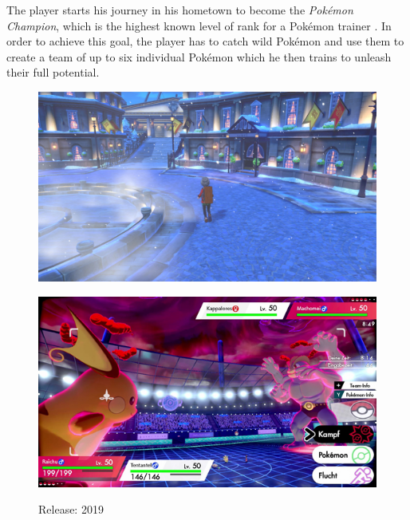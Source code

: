 The player starts his journey in his hometown to become the \textit{Pokémon Champion}, which is the highest known 
level of rank for a Pokémon trainer . In order
to achieve this goal, the player has to catch wild Pokémon and use them to create a team of up to six individual 
Pokémon which he then trains to unleash their full potential. 
\begin{figure}
  \centering
  \begin{minipage}{.5\textwidth}
    \centering
    \includegraphics[width=.95\linewidth]{images/Sword-0.jpg}
    \label{fig:sword0}
  \end{minipage}%
  \begin{minipage}{.5\textwidth}
    \centering
    \includegraphics[width=.95\linewidth]{images/Sword-1.jpg}
    \label{fig:sword1}
  \end{minipage}
  \caption*{Release: 2019}
\end{figure}
